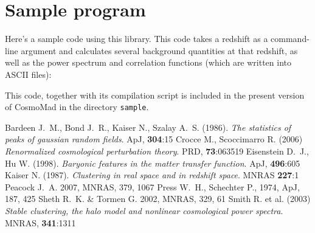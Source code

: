 \documentclass[a4paper,10pt]{article}
\newcommand{\vari}[2]{\textcolor{OliveGreen}{#1}{#2}}
\newcommand{\functi}[3]{{\tt\textcolor{OliveGreen}{#1}
    \textcolor{blue}{#2}(#3)}}
\newenvironment{funcdef}[2][void main(void)]
{\vspace{12pt}\par\noindent{\large{\bf #1}}\vspace{5pt}
 \par\noindent\leftskip=20pt{{#2}}\vspace{5pt}
 \par\noindent\leftskip=5pt\rightskip=5pt}
{\par\leftskip=0pt\rightskip=0pt\vspace{12pt}}
\begin{document}

\newpage
\section{Sample program}\label{sec:sample}

Here's a sample code using this library. This code takes a redshift as a command-line argument and calculates
several background quantities at that redshift, as well as the power spectrum and correlation functions (which
are written into ASCII files):



This code, together with its compilation script is included in the present version of CosmoMad
in the directory {\tt sample}.

\begin{thebibliography}{}
  Bardeen J.~M., Bond J.~R., Kaiser N., Szalay A.~S. (1986). {\sl The statistics of peaks of gaussian random fields}. ApJ, {\bf 304}:15
  Crocce M., Scoccimarro R. (2006) {\sl Renormalized cosmological perturbation theory}. PRD, {\bf 73}:063519
  Eisenstein D.~J., Hu W. (1998). {\sl Baryonic features in the matter transfer function}. ApJ, {\bf 496}:605
  Kaiser N. (1987). {\sl  Clustering in real space and in redshift space}. MNRAS {\bf 227}:1
  Peacock J.~A. 2007, MNRAS, 379, 1067
  Press W.~H., Schechter P., 1974, ApJ, 187, 425
  Sheth R.~K. \& Tormen G. 2002, MNRAS, 329, 61
  Smith R. et al. (2003) {\sl Stable clustering, the halo model and nonlinear cosmological power spectra}. MNRAS, {\bf 341}:1311
\end{thebibliography}
\end{document}
